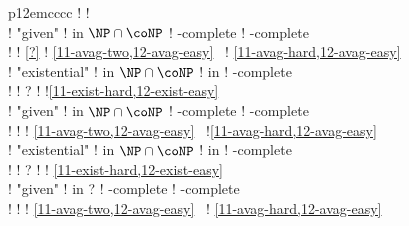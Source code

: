 \begin{landscape}
\begin{tabular}{p{12em}cccc}
  ! %
  ! 
  \\
  ! "given"
  ! in $\NP\cap\coNP$ 
  ! \EXP-complete
  ! \kEXP[2]-complete
  \\[-.5em]
  ! %
  ! {\tiny\cref{?}}                
  !
    {\tiny\cref{11-avag-two,12-avag-easy}~\cite{Fahrenberg&Juhl&Larsen&Srba:2011,Courtois&Schmitz:2014}}
  ! {\tiny\cref{11-avag-hard,12-avag-easy} \cite{Courtois&Schmitz:2014}}\\
  \addlinespace
  ! "existential"
  ! in $\NP\cap\coNP$
  ! in \coNP
  ! \coNP-complete
  \\[-.5em]
  ! %
  ! {\tiny\cite{Chatterjee&Doyen:2012}?}
  !
  !{\tiny\cref{11-exist-hard,12-exist-easy}~\cite{Chatterjee&Doyen&Henzinger&Raskin:2010}}
  \\
  ! "given"
  ! in $\NP\cap\coNP$ 
  ! \EXP-complete
  ! \kEXP[2]-complete
  \\[-.5em]
  ! %
  ! {\tiny\cite{Bouyer&Fahrenberg&Larsen&Markey&Srba:2008}}
  ! {\tiny\cref{11-avag-two,12-avag-easy}~\cite{Fahrenberg&Juhl&Larsen&Srba:2011,Jurdzinski&Lazic&Schmitz:2015}}
  !{\tiny\cref{11-avag-hard,12-avag-easy}~\cite{Courtois&Schmitz:2014,Jurdzinski&Lazic&Schmitz:2015}}
  \\
  \addlinespace
  ! "existential"
  ! in $\NP\cap\coNP$
  ! in \coNP 
  ! \coNP-complete
  \\[-.5em]
  ! %
  ! {\tiny\cite{Chatterjee&Doyen:2012}?}
  ! 
  ! {\tiny\cref{11-exist-hard,12-exist-easy}~\cite{Chatterjee&Doyen&Henzinger&Raskin:2010,Chatterjee&Randour&Raskin:2014}}
  \\
  ! "given"
  ! in \EXP?%
  ! \EXP-complete
  ! \kEXP[2]-complete
  \\[-.5em]
  ! %
  ! {\tiny}
  ! {\tiny\cref{11-avag-two,12-avag-easy}~\cite{Fahrenberg&Juhl&Larsen&Srba:2011,Colcombet&Jurdzinski&Lazic&Schmitz:2017}} 
  ! {\tiny\cref{11-avag-hard,12-avag-easy}~\cite{Courtois&Schmitz:2014,Colcombet&Jurdzinski&Lazic&Schmitz:2017}}\\
  \bottomrule  
  \end{tabular}
  \fi
  \endgroup
    \end{landscape}
